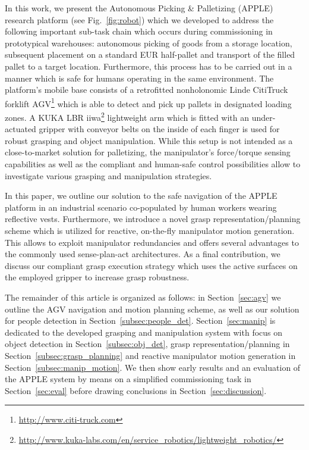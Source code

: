 In this work, we present the Autonomous Picking \& Palletizing (APPLE) research platform (see
Fig.~\ref{fig:robot}) which we developed to address the following important sub-task chain which
occurs during commissioning in prototypical warehouses: autonomous picking of goods from a storage
location, subsequent placement on a standard EUR half-pallet and transport of the filled pallet to a
target location. Furthermore, this process has to be carried out in a manner which is safe for
humans operating in the same environment. The platform's mobile base consists of a retrofitted
nonholonomic Linde CitiTruck forklift AGV\footnote{\url{ http://www.citi-truck.com}} which is able
to detect and pick up pallets in designated loading zones. A KUKA LBR
iiwa\footnote{\url{http://www.kuka-labs.com/en/service_robotics/lightweight_robotics/}} lightweight
arm which is fitted with an under-actuated gripper with conveyor belts on the inside of each finger
is used for robust grasping and object manipulation. While this setup is not intended as a
close-to-market solution for palletizing, the manipulator's force/torque sensing capabilities as
well as the compliant and human-safe control possibilities allow to investigate various grasping and
manipulation strategies.

In this paper, we outline our solution to the safe navigation of the APPLE platform in an industrial
scenario co-populated by human workers wearing reflective vests. Furthermore, we introduce a novel
grasp representation/planning scheme which is utilized for reactive, on-the-fly manipulator motion
generation. This allows to exploit manipulator redundancies and offers several advantages to the
commonly used sense-plan-act architectures. As a final contribution, we discuss our compliant grasp
execution strategy which uses the active surfaces on the employed gripper to increase grasp
robustness.

The remainder of this article is organized as follows: in Section~\ref{sec:agv} we outline the AGV
navigation and motion planning scheme, as well as our solution for people detection in
Section~\ref{subsec:people_det}. Section~\ref{sec:manip} is dedicated to the developed grasping and
manipulation system with focus on object detection in Section~\ref{subsec:obj_det}, grasp
representation/planning in Section~\ref{subsec:grasp_planning} and reactive manipulator motion
generation in Section~\ref{subsec:manip_motion}. We then show early results and an evaluation of the
APPLE system by means on a simplified commissioning task in Section~\ref{sec:eval} before drawing
conclusions in Section~\ref{sec:discussion}.
